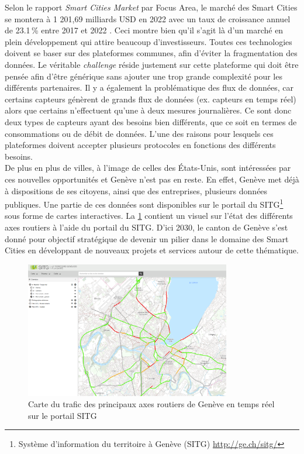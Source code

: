 Selon le rapport \textit{Smart Cities Market} par Focus Area, le marché des Smart Cities se montera à 1 201,69 milliards USD en 2022 avec un taux de croissance annuel de 23.1\,\% entre 2017 et 2022 \cite{SmartCit61:online}. Ceci montre bien qu'il s'agit là d'un marché en plein développement qui attire beaucoup d'investisseurs. Toutes ces technologies doivent se baser sur des plateformes communes, afin d'éviter la fragmentation des données. Le véritable \textit{challenge} réside justement sur cette plateforme qui doit être pensée afin d'être générique sans ajouter une trop grande complexité pour les différents partenaires. Il y a également la problématique des flux de données, car certains capteurs génèrent de grands flux de données (ex. capteurs en temps réel) alors que certains n'effectuent qu'une à deux mesures journalières. Ce sont donc deux types de capteurs ayant des besoins bien différents, que ce soit en termes de consommations ou de débit de données. L'une des raisons pour lesquels ces plateformes doivent accepter plusieurs protocoles en fonctions des différents besoins.\\

De plus en plus de villes, à l'image de celles des États-Unis, sont intéressées par ces nouvelles opportunités et Genève n'est pas en reste. En effet, Genève met déjà à dispositions de ses citoyens, ainsi que des entreprises, plusieurs données publiques. Une partie de ces données sont disponibles sur le portail du SITG\footnote{Système d'information du territoire à Genève (SITG) \url{http://ge.ch/sitg/}} sous forme de cartes interactives. La \cref{fig-sitg_mobilite} contient un visuel sur l'état des différents axes routiers à l'aide du portail du SITG. D'ici 2030, le canton de Genève s'est donné pour objectif stratégique de devenir un pilier dans le domaine des Smart Cities \cite{Genevebr38:online} en développant de nouveaux projets et services autour de cette thématique.

\begin{figure}[ht!]
    \centering
    \includegraphics[width=0.80\textwidth]{Figures/StateOfTheArt/sitg_mobilite.PNG}
    \caption{Carte du trafic des principaux axes routiers de Genève en temps réel sur le portail SITG}
    \label{fig-sitg_mobilite}
\end{figure}


